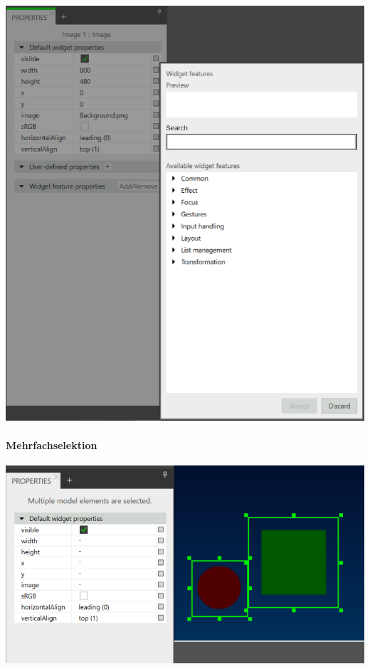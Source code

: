 \begin{center}
  \includegraphics[scale=0.4]{figures/WidgetFeatureProperty_Adaption.png}
  \label{fig:FeatureProperty_Adaption}
\end{center}


\paragraph{Mehrfachselektion}

\begin{center}
  \includegraphics[scale=0.4]{figures/Mehrfachselektion_Adaption.png}
  \label{fig:Mehrfachselektion_Adaption}
\end{center}


